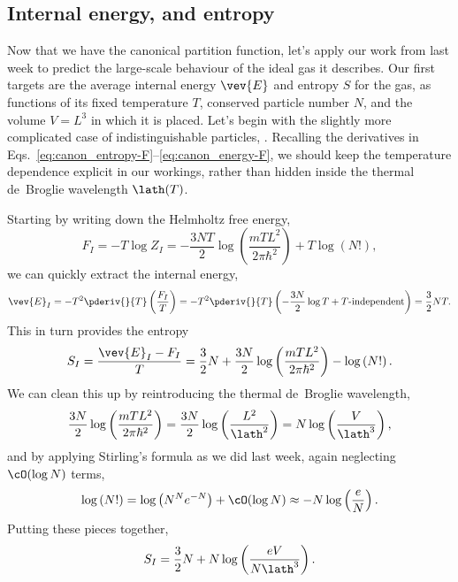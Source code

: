 \subsection{Internal energy, and entropy}
Now that we have the canonical partition function, let's apply our work from last week to predict the large-scale behaviour of the ideal gas it describes.
Our first targets are the average internal energy $\vev{E}$ and entropy $S$ for the gas, as functions of its fixed temperature $T$, conserved particle number $N$, and the volume $V = L^3$ in which it is placed.
Let's begin with the slightly more complicated case of indistinguishable particles, .
Recalling the derivatives in Eqs.~\ref{eq:canon_entropy-F}--\ref{eq:canon_energy-F}, we should keep the temperature dependence explicit in our workings, rather than hidden inside the thermal de~Broglie wavelength $\lath(T)$.

Starting by writing down the Helmholtz free energy,
\begin{equation*}
  F_I = -T \log Z_I = -\frac{3NT}{2}\log\left(\frac{mTL^2}{2\pi\hbar^2}\right) + T \log\left(N!\right),
\end{equation*}
we can quickly extract the internal energy,
\begin{equation*}
  \vev{E}_I = -T^2 \pderiv{}{T}\left(\frac{F_I}{T}\right) = -T^2 \pderiv{}{T}\left(-\frac{3N}{2}\log T + T\mbox{-independent}\right) = \frac{3}{2} NT.
\end{equation*}
This in turn provides the entropy
\begin{equation*}
  S_I = \frac{\vev{E}_I - F_I}{T} = \frac{3}{2} N + \frac{3N}{2}\log\left(\frac{mTL^2}{2\pi\hbar^2}\right) - \log\left(N!\right).
\end{equation*}
We can clean this up by reintroducing the thermal de~Broglie wavelength,
\begin{equation*}
  \frac{3N}{2}\log\left(\frac{mTL^2}{2\pi\hbar^2}\right) = \frac{3N}{2}\log\left(\frac{L^2}{\lath^2}\right) = N\log\left(\frac{V}{\lath^3}\right),
\end{equation*}
and by applying Stirling's formula as we did last week, again neglecting $\cO(\log N)$ terms,
\begin{equation*}
  \log\left(N!\right) = \log\left(N^N e^{-N}\right) + \cO(\log N) \approx -N \log\left(\frac{e}{N}\right).
\end{equation*}
Putting these pieces together, %
\begin{equation*}
  S_I = \frac{3}{2} N + N \log\left(\frac{eV}{N\lath^3}\right).
\end{equation*}

